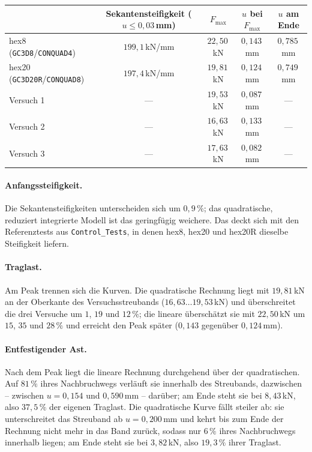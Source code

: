 \documentclass[a4paper,11pt]{article}
\newcommand{\code}[1]{\texttt{\small #1}}
\newcommand{\file}[1]{\texttt{\small #1}}
\begin{document}
\begin{center}
\small
\begin{tabular}{lcccc}
\toprule
 & Sekantensteifigkeit ($u\le0{,}03$\,mm) & $F_{\max}$ & $u$ bei $F_{\max}$ & $u$ am Ende \\
\midrule
hex8 (\code{GC3D8}/\code{CONQUAD4})    & $199{,}1$\,kN/mm & $22{,}50$\,kN & $0{,}143$\,mm & $0{,}785$\,mm \\
hex20 (\code{GC3D20R}/\code{CONQUAD8}) & $197{,}4$\,kN/mm & $19{,}81$\,kN & $0{,}124$\,mm & $0{,}749$\,mm \\
\midrule
Versuch 1 & --- & $19{,}53$\,kN & $0{,}087$\,mm & --- \\
Versuch 2 & --- & $16{,}63$\,kN & $0{,}133$\,mm & --- \\
Versuch 3 & --- & $17{,}63$\,kN & $0{,}082$\,mm & --- \\
\bottomrule
\end{tabular}
\end{center}

\paragraph{Anfangssteifigkeit.}
Die Sekantensteifigkeiten unterscheiden sich um $0{,}9\,\%$; das quadratische, reduziert
integrierte Modell ist das geringfügig weichere. Das deckt sich mit den Referenztests aus
\file{Control\_Tests}, in denen hex8, hex20 und hex20R dieselbe Steifigkeit liefern.

\paragraph{Traglast.}
Am Peak trennen sich die Kurven. Die quadratische Rechnung liegt mit $19{,}81$\,kN an der Oberkante
des Versuchsstreubands ($16{,}63\ldots19{,}53$\,kN) und überschreitet die drei Versuche um $1$,
$19$ und $12\,\%$; die lineare überschätzt sie mit $22{,}50$\,kN um $15$, $35$ und $28\,\%$ und
erreicht den Peak später ($0{,}143$ gegenüber $0{,}124$\,mm).

\paragraph{Entfestigender Ast.}
Nach dem Peak liegt die lineare Rechnung durchgehend über der quadratischen. Auf $81\,\%$ ihres
Nachbruchwegs verläuft sie innerhalb des Streubands, dazwischen -- zwischen $u=0{,}154$ und
$0{,}590$\,mm -- darüber; am Ende steht sie bei $8{,}43$\,kN, also $37{,}5\,\%$ der eigenen
Traglast. Die quadratische Kurve fällt steiler ab: sie unterschreitet das Streuband ab
$u=0{,}200$\,mm und kehrt bis zum Ende der Rechnung nicht mehr in das Band zurück, sodass nur
$6\,\%$ ihres Nachbruchwegs innerhalb liegen; am Ende steht sie bei $3{,}82$\,kN, also
$19{,}3\,\%$ ihrer Traglast.
\end{document}
